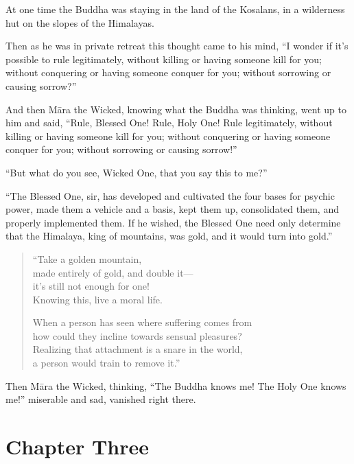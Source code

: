 \documentclass[12pt,openany]{book}%
\let\oldcontentsline\contentsline
\newcommand{\nopagecontentsline}[3]{\oldcontentsline{#1}{#2}{}}
\newcommand*{\tocchapterline}[1]{\bfseries\itshape{#1}}
\begin{document}
At one time the Buddha was staying in the land of the Kosalans, in a wilderness hut on the slopes of the Himalayas. 

Then as he was in private retreat this thought came to his mind, “I wonder if it’s possible to rule legitimately, without killing or having someone kill for you; without conquering or having someone conquer for you; without sorrowing or causing sorrow?” 

And then \textsanskrit{Māra} the Wicked, knowing what the Buddha was thinking, went up to him and said, “Rule, Blessed One! Rule, Holy One! Rule legitimately, without killing or having someone kill for you; without conquering or having someone conquer for you; without sorrowing or causing sorrow!” 

“But what do you see, Wicked One, that you say this to me?” 

“The Blessed One, sir, has developed and cultivated the four bases for psychic power, made them a vehicle and a basis, kept them up, consolidated them, and properly implemented them. If he wished, the Blessed One need only determine that the Himalaya, king of mountains, was gold, and it would turn into gold.” 

\begin{verse}%
“Take a golden mountain, \\
made entirely of gold, and double it—\\
it’s still not enough for one! \\
Knowing this, live a moral life. 

When a person has seen where suffering comes from \\
how could they incline towards sensual pleasures? \\
Realizing that attachment is a snare in the world, \\
a person would train to remove it.” 

%
\end{verse}

Then \textsanskrit{Māra} the Wicked, thinking, “The Buddha knows me! The Holy One knows me!” miserable and sad, vanished right there. 

%
\chapter*{Chapter Three }
\addcontentsline{toc}{chapter}{\tocchapterline{Chapter Three }}
\addtocontents{toc}{\let\protect\contentsline\protect\oldcontentsline}
\end{document}
